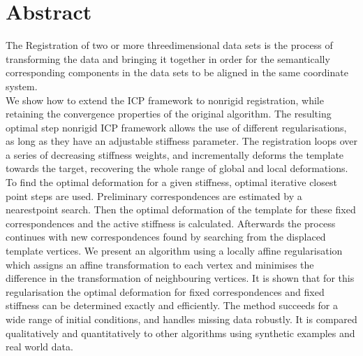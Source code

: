 \documentclass[../structure.tex]{subfiles}
\begin{document}
\chapter*{Abstract}
\hspace{.5cm} The Registration of two or more threedimensional data sets is the process of transforming the data and bringing it together in order for the semantically corresponding components in the data sets to be aligned in the same coordinate system\cite{Ganeva2015}.
\\We show how to extend the ICP framework to nonrigid registration, while retaining the convergence properties of the original algorithm. The resulting optimal step nonrigid ICP framework allows the use of different regularisations, as long as they have an adjustable stiffness parameter. The registration loops over a series of decreasing stiffness weights, and incrementally deforms the template towards the target, recovering the whole range of global and local deformations. To find the optimal deformation for a given stiffness, optimal iterative closest point steps are used. Preliminary correspondences are estimated by a nearestpoint search. Then the optimal deformation of the template for these fixed correspondences and the active stiffness is calculated. Afterwards the process continues with new correspondences found by searching from the displaced template vertices. We present an algorithm using a locally affine regularisation which assigns an affine transformation to each vertex and minimises the difference in the transformation of neighbouring vertices. It is shown that for this regularisation the optimal deformation for fixed correspondences and fixed stiffness can be determined exactly and efficiently. The method succeeds for a wide range of initial conditions, and handles missing data robustly. It is compared qualitatively and quantitatively to other algorithms using synthetic examples and real world data\cite{Amberg2007}.
\end{document}
